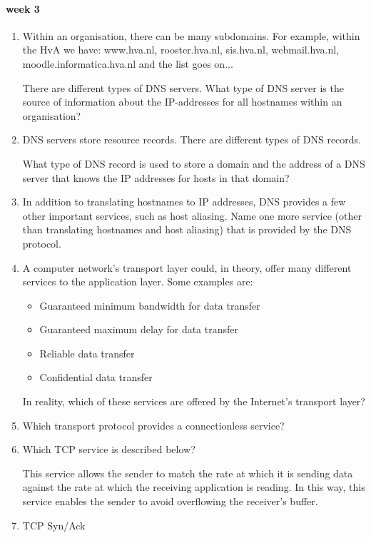 \paragraph{week 3}
\begin{enumerate}
    \item Within an organisation, there can be many subdomains. For example, within the HvA we have: www.hva.nl, rooster.hva.nl, sis.hva.nl, webmail.hva.nl, moodle.informatica.hva.nl and the list goes on...

    There are different types of DNS servers. What type of DNS server is the source of information about the IP-addresses for all hostnames within an organisation?
    \item DNS servers store resource records. There are different types of DNS records.

    What type of DNS record is used to store a domain and the address of a DNS server that knows the IP addresses for hosts in that domain?
    \item In addition to translating hostnames to IP addresses, DNS provides a few other important services, such as host aliasing. Name one more service (other than translating hostnames and host aliasing) that is provided by the DNS protocol.
    \item A computer network's transport layer could, in theory, offer many different services to the application layer. Some examples are:
    \begin{itemize}
        \item Guaranteed minimum bandwidth for data transfer
        \item Guaranteed maximum delay for data transfer
        \item Reliable data transfer
        \item Confidential data transfer

    \end{itemize}

    In reality, which of these services are offered by the Internet's transport layer?
    \item Which transport protocol provides a connectionless service?
    \item Which TCP service is described below?

    This service allows the sender to match the rate at which it is sending data against the rate at which the receiving application is reading. In this way, this service enables the sender to avoid overflowing the receiver's buffer.
    \item TCP Syn/Ack


\end{enumerate}
